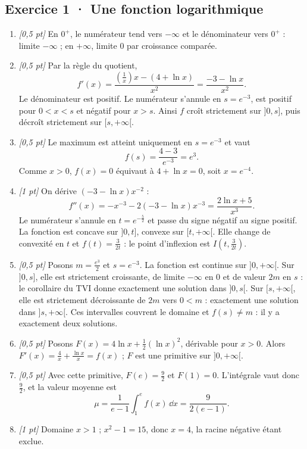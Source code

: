 \subsection*{Exercice 1 · Une fonction logarithmique}\begin{enumerate}

\item \textit{[0,5 pt]} En $0^+$, le numérateur tend vers $-\infty$ et le dénominateur vers $0^+$ : limite $-\infty$ ; en $+\infty$, limite $0$ par croissance comparée.

\item \textit{[0,5 pt]} Par la règle du quotient,
\[f'(x)=\frac{(\frac{1}{x})x-(4+\ln x)}{x^2}=\frac{-3-\ln x}{x^2}.\]
Le dénominateur est positif. Le numérateur s'annule en $s=e^{-3}$, est positif pour $0<x<s$ et négatif pour $x>s$. Ainsi $f$ croît strictement sur $]0,s]$, puis décroît strictement sur $[s,+\infty[$.

\item \textit{[0,5 pt]} Le maximum est atteint uniquement en $s=e^{-3}$ et vaut
\[f(s)=\frac{4- 3}{e^{-3}}=e^{3}.\]
Comme $x>0$, $f(x)=0$ équivaut à $4+\ln x=0$, soit $x=e^{-4}$.

\item \textit{[1 pt]} On dérive $(-3-\ln x)x^{-2}$ :
\[f''(x)=-x^{-3}-2(-3-\ln x)x^{-3}=\frac{2\ln x+5}{x^3}.\]
Le numérateur s'annule en $t=e^{-\frac{5}{2}}$ et passe du signe négatif au signe positif. La fonction est concave sur $]0,t]$, convexe sur $[t,+\infty[$. Elle change de convexité en $t$ et $f(t)=\frac{3}{2t}$ : le point d'inflexion est $I(t,\frac{3}{2t})$.

\item \textit{[0,5 pt]} Posons $m=\frac{e^{3}}{2}$ et $s=e^{-3}$. La fonction est continue sur $]0,+\infty[$. Sur $]0,s]$, elle est strictement croissante, de limite $-\infty$ en $0$ et de valeur $2m$ en $s$ : le corollaire du TVI donne exactement une solution dans $]0,s[$. Sur $[s,+\infty[$, elle est strictement décroissante de $2m$ vers $0<m$ : exactement une solution dans $]s,+\infty[$. Ces intervalles couvrent le domaine et $f(s)\ne m$ : il y a exactement deux solutions.

\item \textit{[0,5 pt]} Posons $F(x)=4\ln x+\frac12(\ln x)^2$, dérivable pour $x>0$. Alors $F'(x)=\frac{4}{x}+\frac{\ln x}{x}=f(x)$ ; $F$ est une primitive sur $]0,+\infty[$.

\item \textit{[0,5 pt]} Avec cette primitive, $F(e)=\frac{9}{2}$ et $F(1)=0$. L'intégrale vaut donc $\frac{9}{2}$, et la valeur moyenne est
\[\mu=\frac{1}{e-1}\int_1^e f(x)\,\dd x=\frac{9}{2(e-1)}.\]

\item \textit{[1 pt]} Domaine $x>1$ ; $x^2-1=15$, donc $x=4$, la racine négative étant exclue.

\end{enumerate}

